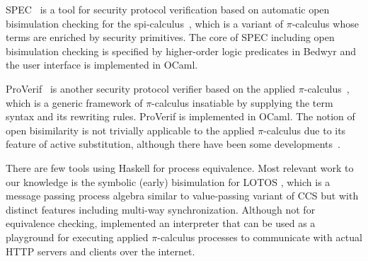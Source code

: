 SPEC~\cite{TiuNamHor16spec} is a tool for security protocol verification based on
automatic open bisimulation checking \cite{TiuDaw10} for the spi-calculus~\cite{Abadi97ccs},
which is a variant of $\pi$-calculus whose terms are enriched by security primitives.
The core of SPEC including open bisimulation checking is specified by
higher-order logic predicates in Bedwyr \cite{Bedwyr07} and the user interface
is implemented in OCaml.

ProVerif~\cite{BlaFou05} is another security protocol verifier based on
the applied $\pi$-calculus~\cite{AbaFou01appi}, which is a generic framework of
$\pi$-calculus insatiable by supplying the term syntax and its
rewriting rules. ProVerif is implemented in OCaml.
The notion of open bisimilarity is not trivially applicable to 
the applied $\pi$-calculus due to its feature of active substitution,
although there have been some developments~\cite{ZhuGuWu08}.

There are few tools using Haskell for process equivalence.
Most relevant work to our knowledge is the symbolic (early) bisimulation for
LOTOS \cite{CalSha01lotos}, which is a message passing process algebra
similar to value-passing variant of CCS but with distinct features
including multi-way synchronization. Although not for equivalence checking,
\citet{Renzy14phi} implemented an interpreter that can be used as
a playground for executing applied $\pi$-calculus processes to
communicate with actual HTTP servers and clients over the internet.

